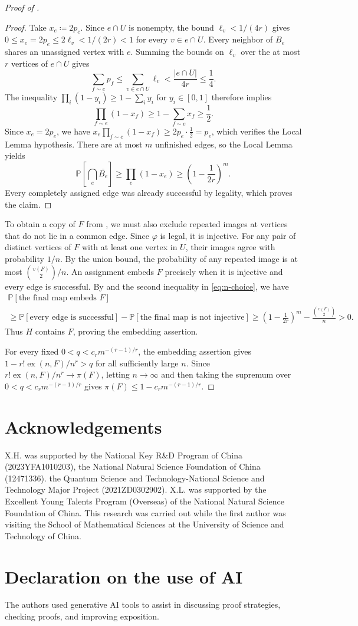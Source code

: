 \documentclass[10pt]{article}
\numberwithin{equation}{section}
\DeclareMathOperator{\ex}{ex}
\newcommand{\Prb}{\mathbb P}
\begin{document}
\begin{proof}[Proof of ]
\begin{proof}
Take $x_e\coloneqq2p_e$. Since $e\cap U$ is nonempty, the bound $\ell_v<1/(4r)$ gives $0\le x_e=2p_e\le2\ell_v<1/(2r)<1$ for every $v\in e\cap U$. Every neighbor of $B_e$ shares an unassigned vertex with $e$. Summing the bounds on $\ell_v$ over the at most $r$ vertices of $e\cap U$ gives
\[
\sum_{f\sim e}p_f
\le\sum_{v\in e\cap U}\ell_v
<\frac{|e\cap U|}{4r}\le\frac14.
\]
The inequality $\prod_i(1-y_i)\ge1-\sum_i y_i$ for $y_i\in[0,1]$ therefore implies
\[
\prod_{f\sim e}(1-x_f)
\ge1-\sum_{f\sim e}x_f
\ge\frac12.
\]
Since $x_e=2p_e$, we have $x_e\prod_{f\sim e}(1-x_f)\ge2p_e\cdot\frac12=p_e$, which verifies the Local Lemma hypothesis. There are at most $m$ unfinished edges, so the Local Lemma yields
\[
\Prb\left[\bigcap_e\overline{B_e}\right]
\ge\prod_e(1-x_e)
\ge\left(1-\frac1{2r}\right)^m.
\]
Every completely assigned edge was already successful by legality, which proves the claim.
\end{proof}

To obtain a copy of $F$ from , we must also exclude repeated images at vertices that do not lie in a common edge. Since $\varphi$ is legal, it is injective. For any pair of distinct vertices of $F$ with at least one vertex in $U$, their images agree with probability $1/n$. By the union bound, the probability of any repeated image is at most $\binom{v(F)}2/n$. An assignment embeds $F$ precisely when it is injective and every edge is successful. By  and the second inequality in \eqref{eq:n-choice}, we have
\begin{multline*}
\Prb[\text{the final map embeds }F]\\
\ge\Prb[\text{every edge is successful}]
-\Prb[\text{the final map is not injective}]
\ge\left(1-\frac1{2r}\right)^m
-\frac{\binom{v(F)}2}{n}>0.
\end{multline*}
Thus $H$ contains $F$, proving the embedding assertion.

For every fixed $0<q<c_rm^{-(r-1)/r}$, the embedding assertion gives $1-r!\ex(n,F)/n^r>q$ for all sufficiently large $n$. Since $r!\ex(n,F)/n^r\to\pi(F)$, letting $n\to\infty$ and then taking the supremum over $0<q<c_rm^{-(r-1)/r}$ gives $\pi(F)\le1-c_rm^{-(r-1)/r}$.
\end{proof}

\section*{Acknowledgements}
X.H. was supported by the National Key R\&D Program of China (2023YFA1010203), the
National Natural Science Foundation of China (12471336).
the Quantum Science and Technology-National Science and Technology Major Project (2021ZD0302902).
X.L. was supported by the Excellent Young Talents Program (Overseas) of the National Natural Science Foundation of China.
This research was carried out while the first author was visiting the School of Mathematical Sciences at the University of Science and Technology of China.

\section*{Declaration on the use of AI}
The authors used generative AI tools to assist in discussing proof strategies, checking proofs, and improving exposition.



\end{document}
